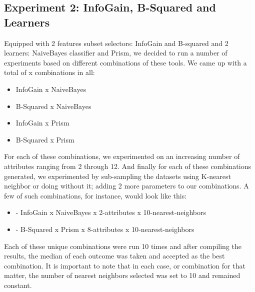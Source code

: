 \documentclass{sig-alternate}
\begin{document}
\subsection{Experiment 2: InfoGain, B-Squared and Learners}
Equipped with 2 features subset selectors: InfoGain and B-squared and 2 learners: NaiveBayes classifier and Prism, we decided to run a number of experiments based on different combinations of these tools. We came up with a total of x combinations in all:

\begin{itemize}
	\item InfoGain x NaiveBayes
	\item B-Squared x NaiveBayes
	\item InfoGain x Prism
	\item B-Squared x Prism
\end{itemize}

For each of these combinations, we experimented on an increasing number of attributes ranging from 2 through 12. And finally for each of these combinations generated, we experimented by sub-sampling the datasets using K-nearest neighbor or doing without it; adding 2 more parameters to our combinations. A few of such combinations, for instance, would look like this:

\begin{itemize}
	\item - InfoGain x NaiveBayes x 2-attributes x 10-nearest-neighbors
	\item - B-Squared x Prism x 8-attributes x 10-nearest-neighbors
\end{itemize}

Each of these unique combinations were run 10 times and after compiling the results, the median of each outcome was taken and accepted as the best combination. It is important to note that in each case, or combination for that matter, the number of nearest neighbors selected was set to 10 and remained constant.
\end{document}
